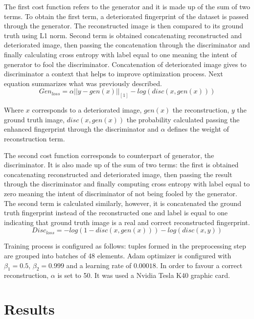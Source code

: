 \documentclass[a4paper,fleqn]{cas-dc}
\begin{document}
The first cost function refers to the generator and it is made up of the sum of two terms. To obtain the first term, a deteriorated fingerprint of the dataset is passed through the generator. The reconstructed image is then compared to its ground truth using L1 norm. Second term is obtained concatenating reconstructed and deteriorated image, then passing the concatenation through the discriminator and finally calculating cross entropy with label equal to one meaning the intent of generator to fool the discriminator. Concatenation of deteriorated image gives to discriminator a context that helps to improve optimization process. Next equation summarizes what was previously described.
\begin{equation}
Gen_{loss} = \alpha||y-gen(x)||_{[1]} - log(disc(x,gen(x)))
\end{equation}

Where $x$ corresponds to a deteriorated image, $gen(x)$ the reconstruction, $y$ the ground truth image, $disc(x,gen(x))$ the probability calculated passing the enhanced fingerprint through the discriminator and $\alpha$ defines the weight of reconstruction term.

The second cost function corresponds to counterpart of generator, the discriminator. It is also made up of the sum of two terms: the first is obtained concatenating reconstructed and deteriorated image, then passing the result through the discriminator and finally computing cross entropy with label equal to zero meaning the intent of discriminator of not being fooled by the generator. The second term is calculated similarly, however, it is concatenated the ground truth fingerprint instead of the reconstructed one and label is equal to one indicating that ground truth image is a real and correct reconstructed fingerprint.
\begin{equation}
Disc_{loss} = -log(1-disc(x,gen(x)))-log(disc(x,y))
\end{equation}

Training process is configured as follows: tuples formed in the preprocessing step are grouped into batches of 48 elements. Adam optimizer is configured with $\beta_{1}=0.5$, $\beta_{2}=0.999$ and a learning rate of $0.00018$. In order to favour a correct reconstruction, $\alpha$ is set to 50. It was used a Nvidia Tesla K40 graphic card.

\section{Results}
\label{sec:R}
\end{document}
